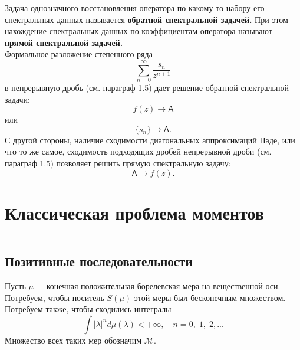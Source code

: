\documentclass[12pt,a4paper]{article}
\theoremstyle{plain}   \newtheorem{Pro}{Задача}
\begin{document}
Задача однозначного восстановления оператора по
какому-то набору его спектральных данных называется
{\bfseries обратной спектральной задачей.}
При этом нахождение спектральных данных по коэффициентам
оператора называют
{\bfseries прямой спектральной задачей.} \\

Формальное разложение степенного ряда
$$
  \sum _{n=0}^{\infty}
    \frac{s_n}{z^{n+1}}
$$
в непрерывную дробь (см. параграф 1.5) дает решение
обратной спектральной задачи:
$$
  f(z) \longrightarrow \mathsf{A}
$$
или
$$
  \{ s_n \} \longrightarrow \mathsf{A}.
$$
С другой стороны, наличие сходимости диагональных аппроксимаций
Паде, или что то же самое, сходимость подходящих дробей
непрерывной дроби (см. параграф 1.5) позволяет решить прямую
спектральную задачу:
$$
  \mathsf{A} \longrightarrow f(z).
$$
\newpage
\section{Классическая проблема моментов}
$ \; $ \\
$ \; $ \\

\subsection{Позитивные последовательности}
$ \; $ \\

Пусть
$ \mu - $
конечная положительная борелевская мера на вещественной оси.
Потребуем, чтобы носитель
$ S( \mu ) $
этой меры был бесконечным множеством. Потребуем также, чтобы
сходились интегралы
$$
  \int | \lambda |^n d \mu ( \lambda ) < + \infty ,
  \quad n=0, \; 1, \; 2,...
$$
Множество всех таких мер обозначим
$ \mathcal{M} .$
\\
\end{document}
